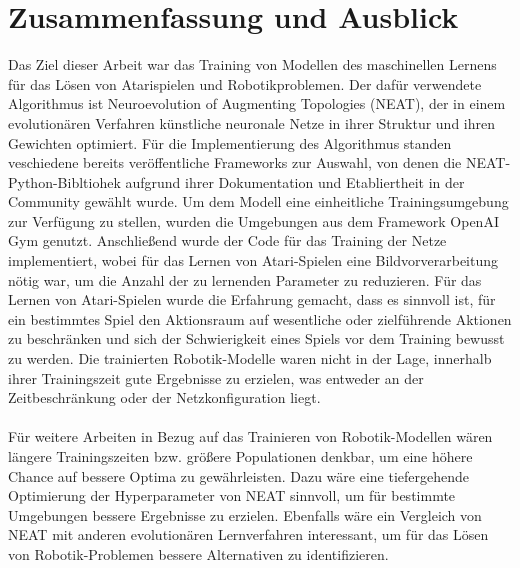 
\chapter{Zusammenfassung und Ausblick}
\label{ch:Conclusion}
Das Ziel dieser Arbeit war das Training von Modellen des maschinellen Lernens für das Lösen von Atarispielen und Robotikproblemen. Der dafür verwendete Algorithmus ist Neuroevolution of Augmenting Topologies (NEAT), der in einem evolutionären Verfahren künstliche neuronale Netze in ihrer Struktur und ihren Gewichten optimiert. Für die Implementierung des Algorithmus standen veschiedene bereits veröffentliche Frameworks zur Auswahl, von denen die NEAT-Python-Bibltiohek aufgrund ihrer Dokumentation und Etabliertheit in der Community gewählt wurde. Um dem Modell eine einheitliche Trainingsumgebung zur Verfügung zu stellen, wurden die Umgebungen aus dem Framework OpenAI Gym genutzt. Anschließend wurde der Code für das Training der Netze implementiert, wobei für das Lernen von Atari-Spielen eine Bildvorverarbeitung nötig war, um die Anzahl der zu lernenden Parameter zu reduzieren. Für das Lernen von Atari-Spielen wurde die Erfahrung gemacht, dass es sinnvoll ist, für ein bestimmtes Spiel den Aktionsraum auf wesentliche oder zielführende Aktionen zu beschränken und sich der Schwierigkeit eines Spiels vor dem Training bewusst zu werden. Die trainierten Robotik-Modelle waren nicht in der Lage, innerhalb ihrer Trainingszeit gute Ergebnisse zu erzielen, was entweder an der Zeitbeschränkung oder der Netzkonfiguration liegt.
\\
\\
Für weitere Arbeiten in Bezug auf das Trainieren von Robotik-Modellen wären längere Trainingszeiten bzw. größere Populationen denkbar, um eine höhere Chance auf bessere Optima zu gewährleisten. Dazu wäre eine tiefergehende Optimierung der Hyperparameter von NEAT sinnvoll, um für bestimmte Umgebungen bessere Ergebnisse zu erzielen. Ebenfalls wäre ein Vergleich von NEAT mit anderen evolutionären Lernverfahren interessant, um für das Lösen von Robotik-Problemen bessere Alternativen zu identifizieren.